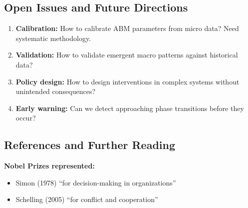 \subsection{Open Issues and Future Directions}
\label{sec:ag-open-issues}


\begin{enumerate}
    \item \textbf{Calibration:} How to calibrate ABM parameters from micro data?
    Need systematic methodology.

    \item \textbf{Validation:} How to validate emergent macro patterns against
    historical data?

    \item \textbf{Policy design:} How to design interventions in complex systems
    without unintended consequences?

    \item \textbf{Early warning:} Can we detect approaching phase transitions
    before they occur?
\end{enumerate}

\subsection{References and Further Reading}
\label{sec:ag-references}


\textbf{Nobel Prizes represented:}
\begin{itemize}[nosep]
    \item Simon (1978) ``for decision-making in organizations''
    \item Schelling (2005) ``for conflict and cooperation''
\end{itemize}

